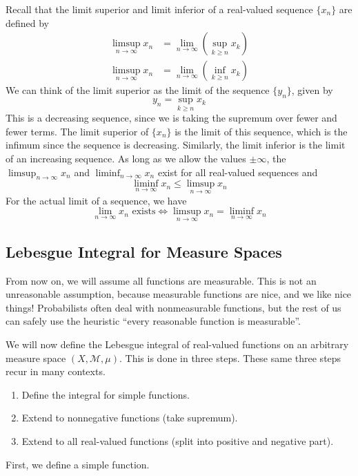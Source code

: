 \documentclass[12pt]{amsart}         %
\theoremstyle{remark}
\begin{document}
Recall that the limit superior and limit inferior of a real-valued sequence $\{ x_n \}$ are defined by
\begin{align*}
\limsup_{n\rightarrow\infty} x_n &= \lim_{n \rightarrow \infty} \left( \sup_{k \geq n} x_k \right) \\
\limsup_{n\rightarrow\infty} x_n &= \lim_{n \rightarrow \infty} \left( \inf_{k \geq n} x_k \right) 
\end{align*}
We can think of the limit superior as the limit of the sequence $\{ y_n \} $, given by
\[
y_n = \sup_{k \geq n} x_k
\]
This is a decreasing sequence, since we is taking the supremum over fewer and fewer terms. The limit superior of $\{x_n \}$ is the limit of this sequence, which is the infimum since the sequence is decreasing. Similarly, the limit inferior is the limit of an increasing sequence. As long as we allow the values $\pm \infty$, the $\limsup_{n\rightarrow\infty} x_n$ and $\liminf_{n\rightarrow\infty} x_n$ exist for all real-valued sequences and
\[
\liminf_{n\rightarrow\infty} x_n 
\leq \limsup_{n\rightarrow\infty} x_n
\]
For the actual limit of a sequence, we have
\[
\lim_{n \rightarrow \infty} x_n \text{ exists} \iff
\limsup_{n\rightarrow\infty} x_n = \liminf_{n\rightarrow\infty} x_n
\]

\subsection{Lebesgue Integral for Measure Spaces}

From now on, we will assume all functions are measurable. This is not an unreasonable assumption, because measurable functions are nice, and we like nice things! Probabilists often deal with nonmeasurable functions, but the rest of us can safely use the heuristic ``every reasonable function is measurable''.

We will now define the Lebesgue integral of real-valued functions on an arbitrary measure space $(X, \mathcal{M}, \mu)$. This is done in three steps. These same three steps recur in many contexts.
\begin{enumerate}
    \item Define the integral for simple functions.
    \item Extend to nonnegative functions (take supremum).
    \item Extend to all real-valued functions (split into positive and negative part).
\end{enumerate}

First, we define a simple function.
\end{document}
